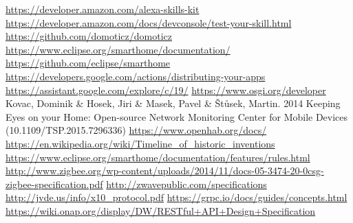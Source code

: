 \begin{thebibliography}{99}
     \url{https://developer.amazon.com/alexa-skills-kit}
     \url{https://developer.amazon.com/docs/devconsole/test-your-skill.html}
     \url{https://github.com/domoticz/domoticz}
     \url{https://www.eclipse.org/smarthome/documentation/}
     \url{https://github.com/eclipse/smarthome}
     \url{https://developers.google.com/actions/distributing-your-apps}
     \url{https://assistant.google.com/explore/c/19/}
     \url{https://www.osgi.org/developer}
     Kovac, Dominik \& Hosek, Jiri \& Masek, Pavel \& Štůsek, Martin. 2014 Keeping Eyes on your Home: Open-source Network Monitoring Center for Mobile Devices (10.1109/TSP.2015.7296336)
     \url{https://www.openhab.org/docs/}
     \url{https://en.wikipedia.org/wiki/Timeline_of_historic_inventions}
     \url{https://www.eclipse.org/smarthome/documentation/features/rules.html}
     \url{http://www.zigbee.org/wp-content/uploads/2014/11/docs-05-3474-20-0csg-zigbee-specification.pdf}
     \url{http://zwavepublic.com/specifications}
     \url{http://jvde.us/info/x10_protocol.pdf}
     \url{https://grpc.io/docs/guides/concepts.html}
     \url{https://wiki.onap.org/display/DW/RESTful+API+Design+Specification}
\end{thebibliography}
